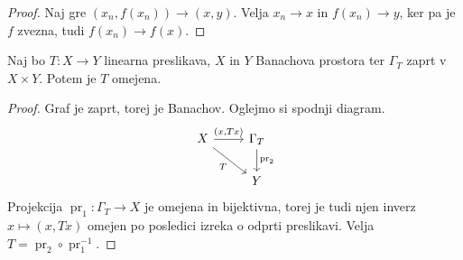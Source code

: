 \begin{proof}
  Naj gre $(x_n, f(x_n)) \to (x,y)$.
  Velja $x_n \to x$ in $f(x_n) \to y$, ker pa je $f$ zvezna, tudi $f(x_n) \to
  f(x)$.
\end{proof}

\begin{izrek}
  Naj bo $T: X \to Y$ linearna preslikava, $X$ in $Y$ Banachova prostora ter
  $\Gamma_T$ zaprt v $X \times Y$.
  Potem je $T$ omejena.
\end{izrek}

\begin{proof}
  Graf je zaprt, torej je Banachov.
  Oglejmo si spodnji diagram.
  \[\begin{tikzcd}
	  X & {\Gamma_T} \\
	  & Y
	  \arrow["{(x, Tx)}", from=1-1, to=1-2]
	  \arrow["T"', from=1-1, to=2-2]
	  \arrow["{\operatorname{pr}_2}", from=1-2, to=2-2]
	\end{tikzcd}\]
  Projekcija $\operatorname{pr}_1: \Gamma_T \to X$ je omejena in bijektivna,
  torej je tudi njen inverz $x \mapsto (x, Tx)$ omejen po posledici izreka o
  odprti preslikavi.
  Velja $T = \operatorname{pr}_2 \circ \operatorname{pr}_1^{-1}$.
\end{proof}


